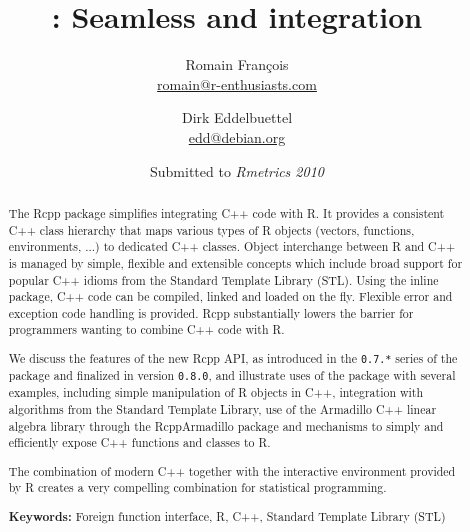 \documentclass[11pt]{article}
\author{
Romain Fran\c{c}ois\\ {\small \url{romain@r-enthusiasts.com} } \and
Dirk Eddelbuettel\\ {\small \url{edd@debian.org} }
}
\title{\pkg{Rcpp}: Seamless \proglang{R} and \proglang{C++} integration}
\date{Submitted to \textsl{Rmetrics 2010}}
\newcommand{\proglang}[1]{\textsf{#1}}
\newcommand{\pkg}[1]{{\fontseries{b}\selectfont #1}}
\begin{document}
\maketitle
\thispagestyle{empty}
\begin{abstract}
  \addtolength{\parskip}{\baselineskip} 	%
  \noindent %
  The \pkg{Rcpp} package simplifies integrating \proglang{C++} code with
  \proglang{R}. It provides a consistent \proglang{C++} class hierarchy that
  maps various types of \proglang{R} objects (vectors, functions,
  environments, ...) to dedicated \proglang{C++} classes. Object interchange
  between \proglang{R} and \proglang{C++} is managed by simple, flexible and
  extensible concepts which include broad support for popular \proglang{C++}
  idioms from the Standard Template Library (STL). Using the \pkg{inline}
  package, \proglang{C++} code can be compiled, linked and loaded on the fly.
  Flexible error and exception code handling is provided.  \pkg{Rcpp}
  substantially lowers the barrier for programmers wanting to combine
  \proglang{C++} code with \proglang{R}.
  
  We discuss the features of the new \pkg{Rcpp} API, as introduced in the 
  \texttt{0.7.*} series of the package and finalized in version \texttt{0.8.0}, 
  and illustrate uses of the package with several examples, including 
  simple manipulation of R objects in C++, integration with algorithms
  from the Standard Template Library, use of the Armadillo C++ linear algebra
  library through the \pkg{RcppArmadillo} package and mechanisms to simply 
  and efficiently expose C++ functions and classes to R. 
  
  The combination of modern \proglang{C++} together with the interactive
  environment provided by \proglang{R} creates a very compelling combination
  for statistical programming.
  
  \noindent \textbf{Keywords:} Foreign function interface, 
  \proglang{R}, \proglang{C++}, Standard Template Library (STL)
\end{abstract}
\end{document}
